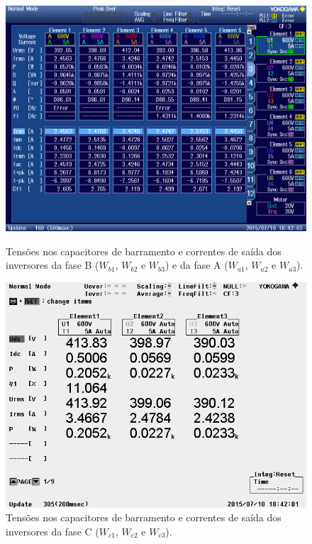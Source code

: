 \documentclass[
	article,			%
	12pt,				%
	twoside,			%
	a4paper,			%
	english,			%
	brazil,				%
	sumario=tradicional
	]{abntex2-modelo-notas-de-aula}
\begin{document}
\begin{figure}[!h]
	\centering
	\begin{minipage}[t]{0.45\textwidth}	\centering
		\includegraphics[width=1\linewidth]{aqs/0002}
		\caption{Tensões nos capacitores de barramento e correntes de saída dos inversores da fase B ($W_{b1}$, $W_{b2}$ e $W_{b3}$) e da fase A ($W_{a1}$, $W_{a2}$ e $W_{a3}$).}
		\label{fig:0002}
	\end{minipage}
	\quad
	\begin{minipage}[t]{0.45\textwidth} \centering
		\includegraphics[width=1\linewidth]{aqs/TTZVSPWM0015}
		\caption{Tensões nos capacitores de barramento e correntes de saída dos inversores da fase C ($W_{c1}$, $W_{c2}$ e $W_{c3}$).}
		\label{fig:TTZVSPWM0015}
	\end{minipage}	
\end{figure}
\end{document}
